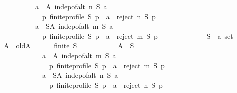 \begin{isabellebody}
\ \ \ \ \ \ \ \ \ \ {\isacharparenleft}{\kern0pt}{\isasymforall}a\ {\isasymin}\ A{\isachardot}{\kern0pt}\ indep{\isacharunderscore}{\kern0pt}of{\isacharunderscore}{\kern0pt}alt\ n\ S\ a\ {\isasymand}\isanewline
\ \ \ \ \ \ \ \ \ \ \ \ {\isacharparenleft}{\kern0pt}{\isasymforall}p{\isachardot}{\kern0pt}\ finite{\isacharunderscore}{\kern0pt}profile\ S\ p\ {\isasymlongrightarrow}\ a\ {\isasymin}\ reject\ n\ S\ p{\isacharparenright}{\kern0pt}{\isacharparenright}{\kern0pt}\ {\isasymand}\isanewline
\ \ \ \ \ \ \ \ \ \ {\isacharparenleft}{\kern0pt}{\isasymforall}a\ {\isasymin}\ S{\isacharminus}{\kern0pt}A{\isachardot}{\kern0pt}\ indep{\isacharunderscore}{\kern0pt}of{\isacharunderscore}{\kern0pt}alt\ m\ S\ a\ {\isasymand}\isanewline
\ \ \ \ \ \ \ \ \ \ \ \ {\isacharparenleft}{\kern0pt}{\isasymforall}p{\isachardot}{\kern0pt}\ finite{\isacharunderscore}{\kern0pt}profile\ S\ p\ {\isasymlongrightarrow}\ a\ {\isasymin}\ reject\ m\ S\ p{\isacharparenright}{\kern0pt}{\isacharparenright}{\kern0pt}{\isacharparenright}{\kern0pt}{\isachardoublequoteclose}\isanewline
\ \ \isamarkupfalse%
\isanewline
\ \ \ \ \isamarkupfalse%
\isanewline
\ \ \ \ \ \ S\ {\isacharcolon}{\kern0pt}{\isacharcolon}{\kern0pt}\ {\isachardoublequoteopen}{\isacharprime}{\kern0pt}a\ set{\isachardoublequoteclose}\isanewline
\ \ \ \ \isamarkupfalse%
\ A\ \ old{\isacharunderscore}{\kern0pt}A{\isacharcolon}{\kern0pt}\isanewline
\ \ \ \ \ \ {\isachardoublequoteopen}finite\ S\ {\isasymlongrightarrow}\isanewline
\ \ \ \ \ \ \ \ \ \ {\isacharparenleft}{\kern0pt}A\ {\isasymsubseteq}\ S\ {\isasymand}\isanewline
\ \ \ \ \ \ \ \ \ \ \ \ {\isacharparenleft}{\kern0pt}{\isasymforall}a\ {\isasymin}\ A{\isachardot}{\kern0pt}\ indep{\isacharunderscore}{\kern0pt}of{\isacharunderscore}{\kern0pt}alt\ m\ S\ a\ {\isasymand}\isanewline
\ \ \ \ \ \ \ \ \ \ \ \ \ \ {\isacharparenleft}{\kern0pt}{\isasymforall}p{\isachardot}{\kern0pt}\ finite{\isacharunderscore}{\kern0pt}profile\ S\ p\ {\isasymlongrightarrow}\ a\ {\isasymin}\ reject\ m\ S\ p{\isacharparenright}{\kern0pt}{\isacharparenright}{\kern0pt}\ {\isasymand}\isanewline
\ \ \ \ \ \ \ \ \ \ \ \ {\isacharparenleft}{\kern0pt}{\isasymforall}a\ {\isasymin}\ S{\isacharminus}{\kern0pt}A{\isachardot}{\kern0pt}\ indep{\isacharunderscore}{\kern0pt}of{\isacharunderscore}{\kern0pt}alt\ n\ S\ a\ {\isasymand}\isanewline
\ \ \ \ \ \ \ \ \ \ \ \ \ \ {\isacharparenleft}{\kern0pt}{\isasymforall}p{\isachardot}{\kern0pt}\ finite{\isacharunderscore}{\kern0pt}profile\ S\ p\ {\isasymlongrightarrow}\ a\ {\isasymin}\ reject\ n\ S\ p{\isacharparenright}{\kern0pt}{\isacharparenright}{\kern0pt}{\isacharparenright}{\kern0pt}{\isachardoublequoteclose}\isanewline

\end{isabellebody}
